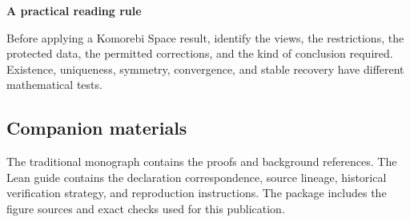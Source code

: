 \documentclass[11pt]{article}
\begin{document}
\begin{insight}
\textbf{A practical reading rule}\par
Before applying a Komorebi Space result, identify the views, the restrictions, the protected data, the permitted corrections, and the kind of conclusion required. Existence, uniqueness, symmetry, convergence, and stable recovery have different mathematical tests.
\end{insight}

\subsection*{Companion materials}
The traditional monograph contains the proofs and background references. The Lean guide contains the declaration correspondence, source lineage, historical verification strategy, and reproduction instructions. The package includes the figure sources and exact checks used for this publication.
\end{document}
